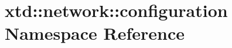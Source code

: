 \hypertarget{namespacextd_1_1network_1_1configuration}{}\section{xtd\+:\+:network\+:\+:configuration Namespace Reference}
\label{namespacextd_1_1network_1_1configuration}
